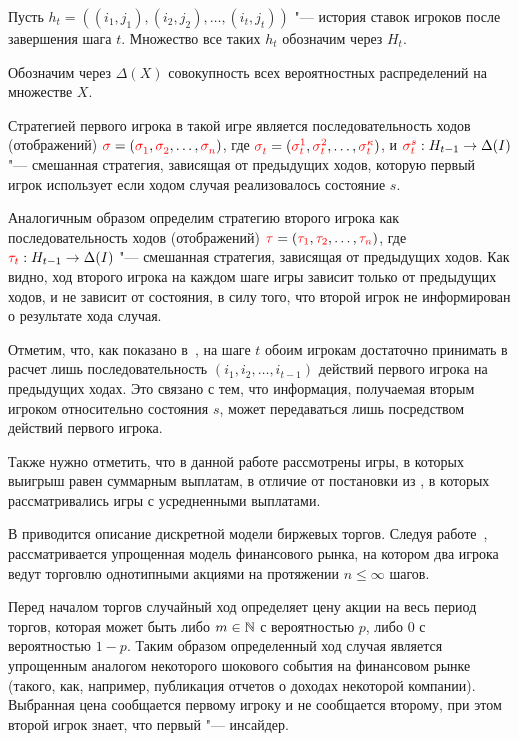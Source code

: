 Пусть $h_t = \left((i_1, j_1), (i_2, j_2), \ldots, (i_t, j_t)\right)$ "--- история ставок игроков после завершения шага $t$.
Множество все таких $h_t$ обозначим через $H_t$. 

Обозначим через $\Delta(X)$ совокупность всех вероятностных распределений на множестве $X$.

Стратегией первого игрока в такой игре является последовательность ходов (отображений) $\sigmar = (\sigmas{1}, \sigmas{2}, \ldots, \sigmas{n})$, где $\sigmas{t} = (\sigmas[1]{t}, \sigmas[2]{t}, \ldots, \sigmas[\kappa]{t})$, и $\sigmas[s]{t}: H_{t-1} \rightarrow \Delta(I)$ "--- смешанная стратегия, зависящая от предыдущих ходов, которую первый игрок использует если ходом случая реализовалось состояние $s$.

Аналогичным образом определим стратегию второго игрока как последовательность ходов (отображений) $\textcolor{red}{\tau} = (\textcolor{red}{\tau_{1}}, \textcolor{red}{\tau_{2}}, \ldots, \textcolor{red}{\tau_{n}})$, где $\textcolor{red}{\tau_{t}}: H_{t-1} \rightarrow \Delta(I)$ "--- смешанная стратегия, зависящая от предыдущих ходов.
Как видно, ход второго игрока на каждом шаге игры зависит только от предыдущих ходов, и не зависит от состояния, в силу того, что второй игрок не информирован о результате хода случая.

Отметим, что, как показано в~\cite{mertens15}, на шаге $t$ обоим игрокам достаточно принимать в расчет лишь последовательность $(i_1, i_2, \ldots, i_{t-1})$ действий первого игрока на предыдущих ходах.
Это связано с тем, что информация, получаемая вторым игроком относительно состояния $s$, может передаваться лишь посредством действий первого игрока.

Также нужно отметить, что в данной работе рассмотрены игры, в которых выигрыш равен суммарным выплатам, в отличие от постановки из \cite{aumann95}, в которых рассматривались игры с усредненными выплатами.

В  приводится описание дискретной модели биржевых торгов.
Следуя работе~\cite{domansky07}, рассматривается упрощенная модель финансового рынка, на котором два игрока ведут торговлю однотипными акциями на протяжении $n \leqslant \infty$ шагов.

Перед началом торгов случайный ход определяет цену акции на весь период торгов, которая может быть либо $m \in \mathbb{N}$ с вероятностью $p$, либо $0$ с вероятностью $1-p$.
Таким образом определенный ход случая является упрощенным аналогом некоторого шокового события на финансовом рынке (такого, как, например, публикация отчетов о доходах некоторой компании).
Выбранная цена сообщается первому игроку и не сообщается второму, при этом второй игрок знает, что первый "--- инсайдер.


